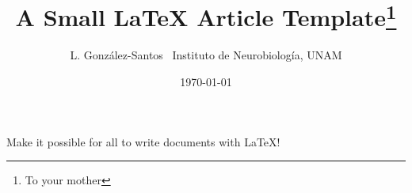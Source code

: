 \documentclass{article}
\title{A Small \LaTeX{} Article Template\thanks{To your mother}}
\author{L. González-Santos  \	Instituto de Neurobiología, UNAM  
	}
\date{\today}
\begin{document}
\maketitle


Make it possible for all to write documents with \LaTeX{}!
\end{document}
